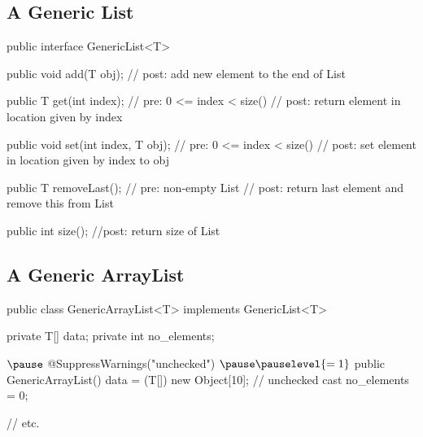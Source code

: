 
\begin{slide}
\section{A Generic List}

\begin{java}
public interface GenericList<T>
{
    public void add(T obj);
    // post: add new element to the end of List

    public T get(int index);
    // pre: 0 <= index < size()
    // post: return element in location given by index

    public void set(int index, T obj);
    // pre: 0 <= index < size()
    // post: set element in location given by index to obj

    public T removeLast();
    // pre: non-empty List
    // post: return last element and remove this from List

    public int size();
    //post: return size of List
}
\end{java}

\end{slide}



\begin{slide}
\section{A Generic ArrayList}
\pb
\begin{java}
public class GenericArrayList<T> implements GenericList<T>
{
    private T[] data;
    private int no_elements;

    $\pause$
    @SuppressWarnings("unchecked") $\pause \pauselevel{=1}$
    public GenericArrayList()
    {
        data = (T[]) new Object[10]; // unchecked cast
        no_elements = 0;
    }

  // etc.
}
\end{java}\pause

\end{slide}


